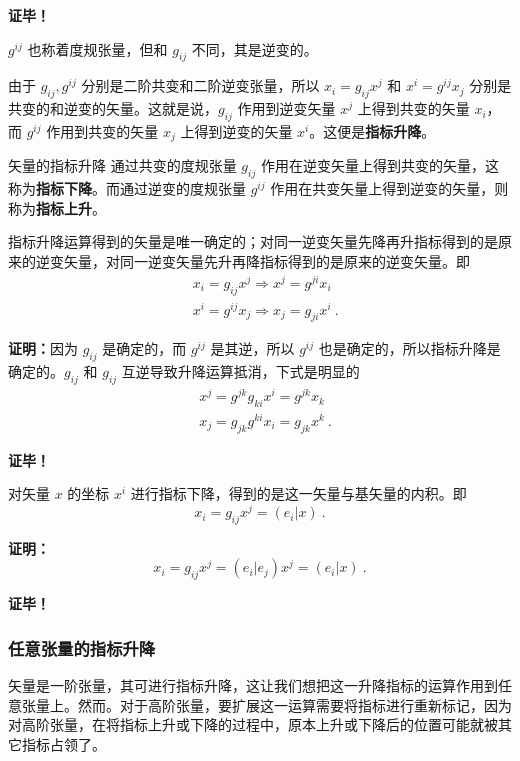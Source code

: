 \textbf{证毕！}

$g^{ij}$ 也称着度规张量，但和 $g_{ij}$ 不同，其是逆变的。

由于 $g_{ij},g^{ij}$ 分别是二阶共变和二阶逆变张量，所以 $x_i=g_{ij}x^j$ 和 $x^i=g^{ij}x_j$ 分别是共变的和逆变的矢量。这就是说，$g_{ij}$ 作用到逆变矢量 $x^j$ 上得到共变的矢量 $x_i$，而 $g^{ij}$ 作用到共变的矢量 $x_j$ 上得到逆变的矢量 $x^i$。这便是\textbf{指标升降}。
\begin{definition}{矢量的指标升降}
通过共变的度规张量 $g_{ij}$ 作用在逆变矢量上得到共变的矢量，这称为\textbf{指标下降}。而通过逆变的度规张量 $g^{ij}$ 作用在共变矢量上得到逆变的矢量，则称为\textbf{指标上升}。
\end{definition}
\begin{theorem}{}
指标升降运算得到的矢量是唯一确定的；对同一逆变矢量先降再升指标得到的是原来的逆变矢量，对同一逆变矢量先升再降指标得到的是原来的逆变矢量。即
\begin{equation}
\begin{aligned}
&x_i=g_{ij}x^j\Rightarrow x^j=g^{ji}x_i
\\
&x^i=g^{ij}x_j\Rightarrow x_j=g_{ji}x^i~.
\end{aligned}
\end{equation}
\end{theorem}
\textbf{证明：}因为 $g_{ij}$ 是确定的，而 $g^{ij}$ 是其逆，所以 $g^{ij}$ 也是确定的，所以指标升降是确定的。$g_{ij}$ 和 $g_{ij}$ 互逆导致升降运算抵消，下式是明显的
\begin{equation}
\begin{aligned}
&x^j=g^{jk}g_{ki}x^i=g^{jk}x_k\\
&x_j=g_{jk}g^{ki}x_i=g_{jk}x^k~.
\end{aligned}
\end{equation}

\textbf{证毕！}
\begin{theorem}{}
对矢量 $x$ 的坐标 $x^i$ 进行指标下降，得到的是这一矢量与基矢量的内积。即
\begin{equation}
x_i=g_{ij}x^j=(e_i|x)~.
\end{equation}
\end{theorem}
\textbf{证明：}
\begin{equation}
x_i=g_{ij}x^j=(e_i|e_j)x^j=(e_i|x)~.
\end{equation}

\textbf{证毕！}
\subsubsection{任意张量的指标升降}
矢量是一阶张量，其可进行指标升降，这让我们想把这一升降指标的运算作用到任意张量上。然而。对于高阶张量，要扩展这一运算需要将指标进行重新标记，因为对高阶张量，在将指标上升或下降的过程中，原本上升或下降后的位置可能就被其它指标占领了。

